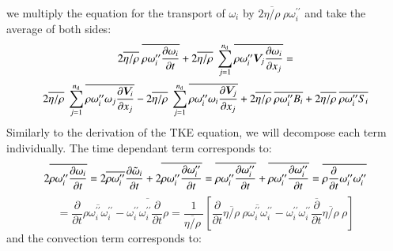 \documentclass{warpdoc}
\newcommand{\alb}{\vspace{0.2cm}\\} %
\newcommand{\nd}{{{n}_{\rm d}}}
\newcommand{\mfd}{\displaystyle}
\begin{document}
we multiply the equation for the transport of $\omega_i$ by
$2 \overline{\eta/\rho}~  \rho  \omega_i^{\prime\prime}$ and take the average of both sides:
%
\begin{equation}
 \begin{array}{c}
   \mfd 2 \overline{\eta/\rho}~ \overline{\rho \omega_i^{\prime\prime} \frac{\partial \omega_i}{\partial t}}
  +2 \overline{\eta/\rho}~ \sum_{j=1}^\nd \overline{\rho  \omega_i^{\prime\prime}  \bm{V}_j  \frac{\partial\omega_i}{\partial x_j}}
   = \alb
   \mfd 2 \overline{\eta/\rho}~ \sum_{j=1}^\nd \overline{\rho  \omega_i^{\prime\prime}  \omega_j  \frac{\partial \bm{V}_i}{\partial x_j}}
  -2 \overline{\eta/\rho}~ \sum_{j=1}^\nd \overline{\rho  \omega_i^{\prime\prime}  \omega_i  \frac{\partial \bm{V}_j}{\partial x_j}}
  +2 \overline{\eta/\rho}~ \overline{\rho \omega_i^{\prime\prime} B_i}
  +2 \overline{\eta/\rho}~ \overline{\rho \omega_i^{\prime\prime} S_i}
 \end{array}
\label{eqn:SDR:1}
\end{equation}
%
Similarly to the derivation of the TKE equation, we will decompose each term
individually. The time dependant term corresponds to:
%
\begin{displaymath}
    2 \mfd\overline{\rho \omega_i^{\prime\prime} \frac{\partial \omega_i }{\partial t}}
     =  2 \mfd\overline{\rho \omega_i^{\prime\prime}} \frac{\partial {\wtilde{\omega}_i} }{\partial t}
          +2 \overline{\rho \omega_i^{\prime\prime} \frac{\partial \omega_i^{\prime\prime} }{\partial t} }
     =  \mfd \overline{\rho \omega_i^{\prime\prime} \frac{\partial \omega_i^{\prime\prime} }{\partial t} }
                 +\overline{\rho \omega_i^{\prime\prime} \frac{\partial \omega_i^{\prime\prime} }{\partial t} }
     =  \mfd \overline{\rho \frac{\partial}{\partial t} \omega_i^{\prime\prime}  \omega_i^{\prime\prime} }
\end{displaymath}
%
\begin{equation}
   =  \mfd \frac{\partial }{\partial t} \overline{\rho \omega_i^{\prime\prime} \omega_i^{\prime\prime} }
     -\overline{\omega_i^{\prime\prime} \omega_i^{\prime\prime}\frac{\partial }{\partial t} \rho }
   =  \frac{1}{\overline{\eta/\rho}~} \left[
         \mfd \frac{\partial }{\partial t} \overline{\eta/\rho}~ \overline{\rho \omega_i^{\prime\prime} \omega_i^{\prime\prime} }
         -\overline{\omega_i^{\prime\prime} \omega_i^{\prime\prime}\frac{\partial }{\partial t} \overline{\eta/\rho}~  \rho }
      \right]
\label{eqn:SDR:time}
\end{equation}
%
and the convection term corresponds to:
\end{document}
